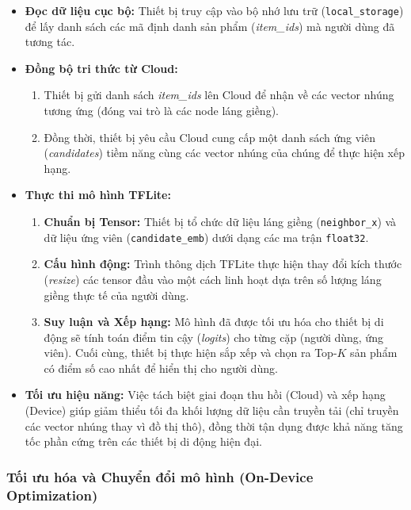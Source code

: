 \begin{itemize}
    \item \textbf{Đọc dữ liệu cục bộ:} Thiết bị truy cập vào bộ nhớ lưu trữ (\texttt{local\_storage}) để lấy danh sách các mã định danh sản phẩm (\textit{item\_ids}) mà người dùng đã tương tác.
    
    \item \textbf{Đồng bộ tri thức từ Cloud:}
    \begin{enumerate}
        \item Thiết bị gửi danh sách \textit{item\_ids} lên Cloud để nhận về các vector nhúng tương ứng (đóng vai trò là các node láng giềng).
        \item Đồng thời, thiết bị yêu cầu Cloud cung cấp một danh sách ứng viên (\textit{candidates}) tiềm năng cùng các vector nhúng của chúng để thực hiện xếp hạng.
    \end{enumerate}
    
    \item \textbf{Thực thi mô hình TFLite:}
    \begin{enumerate}
        \item \textbf{Chuẩn bị Tensor:} Thiết bị tổ chức dữ liệu láng giềng (\texttt{neighbor\_x}) và dữ liệu ứng viên (\texttt{candidate\_emb}) dưới dạng các ma trận \texttt{float32}.
        \item \textbf{Cấu hình động:} Trình thông dịch TFLite thực hiện thay đổi kích thước (\textit{resize}) các tensor đầu vào một cách linh hoạt dựa trên số lượng láng giềng thực tế của người dùng.
        \item \textbf{Suy luận và Xếp hạng:} Mô hình đã được tối ưu hóa cho thiết bị di động sẽ tính toán điểm tin cậy (\textit{logits}) cho từng cặp (người dùng, ứng viên). Cuối cùng, thiết bị thực hiện sắp xếp và chọn ra Top-$K$ sản phẩm có điểm số cao nhất để hiển thị cho người dùng.
    \end{enumerate}
    
    \item \textbf{Tối ưu hiệu năng:} Việc tách biệt giai đoạn thu hồi (Cloud) và xếp hạng (Device) giúp giảm thiểu tối đa khối lượng dữ liệu cần truyền tải (chỉ truyền các vector nhúng thay vì đồ thị thô), đồng thời tận dụng được khả năng tăng tốc phần cứng trên các thiết bị di động hiện đại.
\end{itemize}

\subsubsection{Tối ưu hóa và Chuyển đổi mô hình (On-Device Optimization)}

